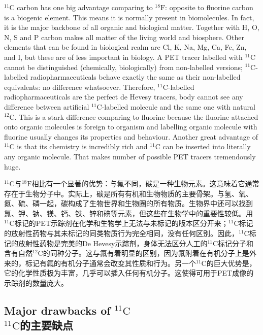 \documentclass[dvipsnames, svgnames,a4paper,11pt]{article}
\begin{document}
${}^\mathrm{11}\mathrm{C}$ carbon has one big advantage comparing to ${}^\mathrm{18}\mathrm{F}$: opposite to fluorine carbon is a
biogenic element. This means it is normally present in biomolecules. In fact, it is the
major backbone of all organic and biological matter. Together with H, O, N, S and P
carbon makes all matter of the living world and biosphere. Other elements that can
be found in biological realm are Cl, K, Na, Mg, Ca, Fe, Zn, and I, but these are of
less important in biology. A PET tracer labelled with ${}^\mathrm{11}\mathrm{C}$ cannot be distinguished
(chemically, biologically) from non-labelled versions; ${}^\mathrm{11}\mathrm{C}$-labelled
radiopharmaceuticals behave exactly the same as their non-labelled equivalents: no
difference whatsoever. Therefore, ${}^\mathrm{11}\mathrm{C}$-labelled radiopharmaceuticals are the perfect
de Hevesy tracers, body cannot see any difference between artificial ${}^\mathrm{11}\mathrm{C}$-labelled
molecule and the same one with natural ${}^\mathrm{12}\mathrm{C}$. This is a stark difference comparing to
fluorine because the fluorine attached onto organic molecules is foreign to organism and labelling organic molecule with fluorine usually changes its properties and
behaviour. Another great advantage of ${}^\mathrm{11}\mathrm{C}$ is that its chemistry is incredibly rich and
${}^\mathrm{11}\mathrm{C}$ can be inserted into literally any organic molecule. That makes number of
possible PET tracers tremendously huge.

${}^\mathrm{11}\mathrm{C}$与${}^\mathrm{18}\mathrm{F}$相比有一个显著的优势：与氟不同，碳是一种生物元素。这意味着它通常存在于生物分子中。实际上，碳是所有有机和生物物质的主要骨架。与氢、氧、氮、硫、磷一起，碳构成了生物世界和生物圈的所有物质。生物界中还可以找到氯、钾、钠、镁、钙、铁、锌和碘等元素，但这些在生物学中的重要性较低。用${}^\mathrm{11}\mathrm{C}$标记的PET示踪剂在化学和生物学上无法与未标记的版本区分开来；${}^\mathrm{11}\mathrm{C}$标记的放射性药物与其未标记的同类物质行为完全相同，没有任何区别。因此，${}^\mathrm{11}\mathrm{C}$标记的放射性药物是完美的De Hevesy示踪剂，身体无法区分人工的${}^\mathrm{11}\mathrm{C}$标记分子和含有自然${}^\mathrm{12}\mathrm{C}$的同种分子。这与氟有着明显的区别，因为氟附着在有机分子上是外来的，标记有氟的有机分子通常会改变其性质和行为。另一个${}^\mathrm{11}\mathrm{C}$的巨大优势是，它的化学性质极为丰富，几乎可以插入任何有机分子。这使得可用于PET成像的示踪剂的数量庞大。

\subsection{Major drawbacks of ${}^\mathrm{11}\mathrm{C}$ \\${}^\mathrm{11}\mathrm{C}$的主要缺点}
\end{document}
